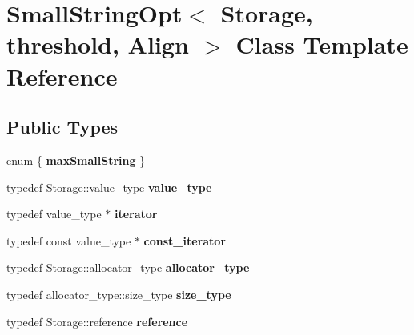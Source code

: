 \hypertarget{classSmallStringOpt}{}\section{Small\+String\+Opt$<$ Storage, threshold, Align $>$ Class Template Reference}
\label{classSmallStringOpt}
\subsection*{Public Types}
\begin{DoxyCompactItemize}
\item 
\hypertarget{classSmallStringOpt_a51c92638f611cc99f58e0a3c001c237a}{}enum \{ {\bfseries max\+Small\+String}
 \}\label{classSmallStringOpt_a51c92638f611cc99f58e0a3c001c237a}

\item 
\hypertarget{classSmallStringOpt_a8086102e8c8d58e7e861305ad9bc001b}{}typedef Storage\+::value\+\_\+type {\bfseries value\+\_\+type}\label{classSmallStringOpt_a8086102e8c8d58e7e861305ad9bc001b}

\item 
\hypertarget{classSmallStringOpt_ac9be07d0c6aacbf93e49534f19db008c}{}typedef value\+\_\+type $\ast$ {\bfseries iterator}\label{classSmallStringOpt_ac9be07d0c6aacbf93e49534f19db008c}

\item 
\hypertarget{classSmallStringOpt_a18fc34d330f5cf619130601361204729}{}typedef const value\+\_\+type $\ast$ {\bfseries const\+\_\+iterator}\label{classSmallStringOpt_a18fc34d330f5cf619130601361204729}

\item 
\hypertarget{classSmallStringOpt_ac28385b62752f9ed69ec3c5094443be1}{}typedef Storage\+::allocator\+\_\+type {\bfseries allocator\+\_\+type}\label{classSmallStringOpt_ac28385b62752f9ed69ec3c5094443be1}

\item 
\hypertarget{classSmallStringOpt_abd00b45b374c99cf07b7390b7f7aef84}{}typedef allocator\+\_\+type\+::size\+\_\+type {\bfseries size\+\_\+type}\label{classSmallStringOpt_abd00b45b374c99cf07b7390b7f7aef84}

\item 
\hypertarget{classSmallStringOpt_a55436c7f3a4c81440b15c4dfb47de37d}{}typedef Storage\+::reference {\bfseries reference}\label{classSmallStringOpt_a55436c7f3a4c81440b15c4dfb47de37d}

\end{DoxyCompactItemize}
